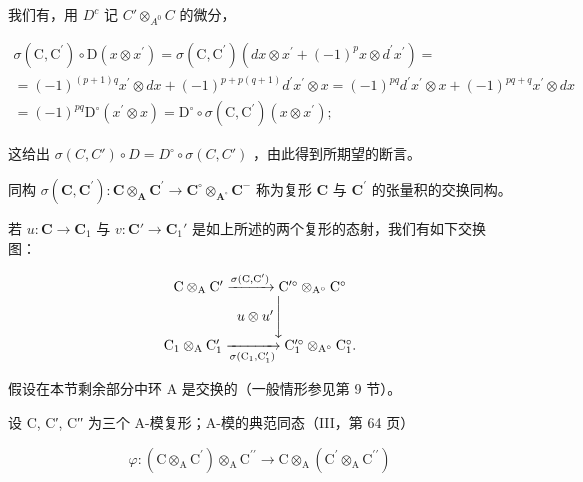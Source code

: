 我们有，用 \(D^{c}\) 记 \(C' \otimes_{A^{0}} C\) 的微分，

\[
\begin{array}{l} \sigma (\mathrm{C}, \mathrm{C} ^ {\prime}) \circ \mathrm{D} (x \otimes x ^ {\prime}) = \sigma (\mathrm{C}, \mathrm{C} ^ {\prime}) (d x \otimes x ^ {\prime} + (- 1) ^ {p} x \otimes d ^ {\prime} x ^ {\prime}) = \\ = (- 1) ^ {(p + 1) q} x ^ {\prime} \otimes d x + (- 1) ^ {p + p (q + 1)} d ^ {\prime} x ^ {\prime} \otimes x = (- 1) ^ {p q} d ^ {\prime} x ^ {\prime} \otimes x + (- 1) ^ {p q + q} x ^ {\prime} \otimes d x \\ = (- 1) ^ {p q} \mathrm{D} ^ {\circ} (x ^ {\prime} \otimes x) = \mathrm{D} ^ {\circ} \circ \sigma (\mathrm{C}, \mathrm{C} ^ {\prime}) (x \otimes x ^ {\prime}); \end{array}
\]

这给出 \(\sigma(C, C') \circ D = D^{\circ} \circ \sigma(C, C')\) ，由此得到所期望的断言。

同构 \(\sigma(\mathbf{C},\mathbf{C}^{\prime}):\mathbf{C}\otimes_{\mathbf{A}}\mathbf{C}^{\prime}\to\mathbf{C}^{\circ}\otimes_{\mathbf{A}^{\circ}}\mathbf{C}^{-}\) 称为复形 \(\mathbf{C}\) 与 \(\mathbf{C}^{\prime}\) 的张量积的交换同构。

若 \(u: \mathbf{C} \to \mathbf{C}_{1}\) 与 \(v: \mathbf{C}' \to \mathbf{C}_{1}'\) 是如上所述的两个复形的态射，我们有如下交换图：

\[
\begin{array}{c} \mathrm{C} \otimes_ {\mathrm{A}} \mathrm{C} ^ {\prime} \xrightarrow {\sigma (\mathrm{C} , \mathrm{C} ^ {\prime})} \mathrm{C} ^ {\prime \circ} \otimes_ {\mathrm{A} ^ {\circ}} \mathrm{C} ^ {\circ} \\ u \otimes u ^ {\prime} \Bigg \downarrow \\ \mathrm{C} _ {1} \otimes_ {\mathrm{A}} \mathrm{C} _ {1} ^ {\prime} \xrightarrow [ \sigma (\mathrm{C} _ {1} , \mathrm{C} _ {1} ^ {\prime}) ]{} \mathrm{C} _ {1} ^ {\prime \circ} \otimes_ {\mathrm{A} ^ {\circ}} \mathrm{C} _ {1} ^ {\circ}. \end{array}
\]

假设在本节剩余部分中环 A 是交换的（一般情形参见第 9 节）。

设 C, C′, C′′ 为三个 A-模复形；A-模的典范同态（III，第 64 页）

\[
\varphi : \left(\mathrm{C} \otimes_ {\mathrm{A}} \mathrm{C} ^ {\prime}\right) \otimes_ {\mathrm{A}} \mathrm{C} ^ {\prime \prime} \rightarrow \mathrm{C} \otimes_ {\mathrm{A}} \left(\mathrm{C} ^ {\prime} \otimes_ {\mathrm{A}} \mathrm{C} ^ {\prime \prime}\right)
\]

